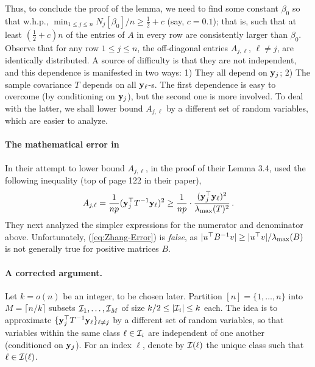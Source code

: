 \documentclass[times,sort&compress,3p]{elsarticle}
\begin{document}
%
Thus, to conclude the proof of the lemma, we need 
to find some constant $\beta_0$ so that w.h.p., ${\min_{1\le j \le n} {N_j[\beta_0]}/{n} \ge \frac12+c}$ (say, $c=0.1$); that is, such that at least $(\frac12+c)n$ of the entries of $A$ in every row are consistently larger than $\beta_0$. 
Observe that for any row $1\le j \le n$, the off-diagonal entries $A_{j,\ell}$, $\ell\ne j$, are identically distributed. A source of difficulty is that they are not independent, and this dependence is manifested in two ways: 1) They all depend on ${\bf y}_j$; 2) The sample covariance $T$ depends on all ${\bf y}_\ell$-s. The first dependence is easy to overcome (by conditioning on ${\bf y}_j$), but the second one is more involved. To deal with the latter, we shall lower bound $A_{j,\ell}$ by a different set of random variables, which are easier to analyze.

\paragraph{The mathematical error in \cite{zhang2016marvcenko}}
In their attempt to
lower bound $A_{j,\ell}$, in the proof
of their Lemma 3.4, \cite{zhang2016marvcenko}  used the following inequality (top of page 122 in their paper), 
\begin{equation}\label{eq:Zhang-Error}
    A_{j,\ell} = \frac{1}{np}({\bf y}_j^\top T^{-1}{\bf y}_\ell)^2 \ge \frac1{np} \cdot  \frac{({\bf y}_j^\top {\bf y}_\ell)^2}{ \lambda_{\max}(T)^2 }\,.
\end{equation}
They next analyzed the
simpler expressions for the numerator and denominator above.  
Unfortunately,  (\ref{eq:Zhang-Error}) is \emph{false}, as $|u^\top B^{-1} v| \ge |u^\top v|/\lambda_{\max}(B)$ is not generally true for positive matrices $B$.

\paragraph{A corrected argument.}
Let $k=o(n)$ be an integer, to be chosen later. Partition $[n]=\{1,\ldots,n\}$ into $M=\lceil n/k\rceil$ subsets $\mathcal{I}_1,\ldots,\mathcal{I}_M$ of size $k/2\le |\mathcal{I}_i|\le k$ each. 
The idea is to approximate $\{{\bf y}_j^\top T^{-1}{\bf y}_\ell\}_{\ell \ne j}$ by a different set of random variables, 
so that variables within the same class $\ell\in \mathcal{I}_i$ are independent of one another (conditioned on ${\bf y}_j$). For an index $\ell$, denote by $\mathcal{I}(\ell)$ the unique class such that $\ell\in \mathcal{I}(\ell)$.
\end{document}

